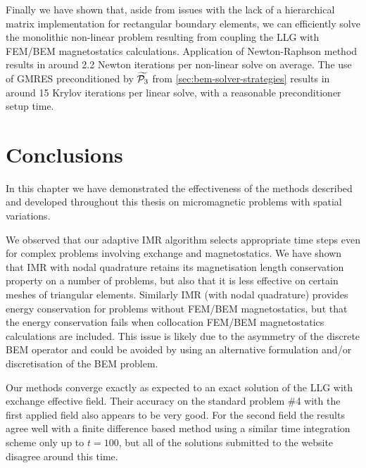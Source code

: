 Finally we have shown that, aside from issues with the lack of a hierarchical matrix implementation for rectangular boundary elements, we can efficiently solve the monolithic non-linear problem resulting from coupling the LLG with FEM/BEM magnetostatics calculations.
Application of Newton-Raphson method results in around 2.2 Newton iterations per non-linear solve on average.
The use of GMRES preconditioned by $\widetilde{\mathcal{P}_3}$ from \cref{sec:bem-solver-strategies} results in around 15 Krylov iterations per linear solve, with a reasonable preconditioner setup time.



\section{Conclusions}
\label{sec:numer-experiments-conclusions}

In this chapter we have demonstrated the effectiveness of the methods described and developed throughout this thesis on micromagnetic problems with spatial variations.

We observed that our adaptive IMR algorithm selects appropriate time steps even for complex problems involving exchange and magnetostatics.
We have shown that IMR with nodal quadrature retains its magnetisation length conservation property on a number of problems, but also that it is less effective on certain meshes of triangular elements.
Similarly IMR (with nodal quadrature) provides energy conservation for problems without FEM/BEM magnetostatics, but that the energy conservation fails when collocation FEM/BEM magnetostatics calculations are included.
This issue is likely due to the asymmetry of the discrete BEM operator and could be avoided by using an alternative formulation and/or discretisation of the BEM problem.

Our methods converge exactly as expected to an exact solution of the LLG with exchange effective field.
Their accuracy on the \mumag standard problem \#4 with the first applied field also appears to be very good.
For the second field the results agree well with a finite difference based method using a similar time integration scheme only up to $t=100$, but all of the solutions submitted to the \mumag website disagree around this time.


